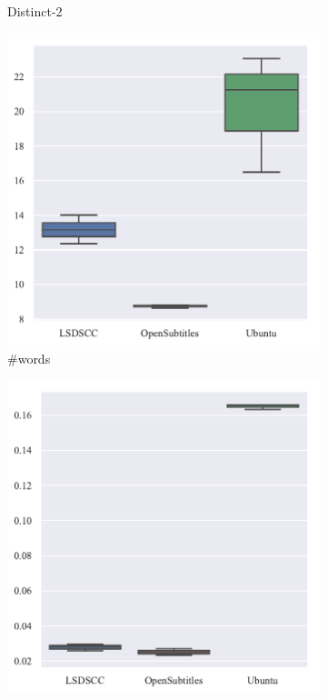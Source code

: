 \begin{figure}[H]
\begin{subfigure}{0.23\linewidth}
        \caption{Distinct-2}
    \end{subfigure}
    \begin{subfigure}{0.23\linewidth}
        \centering
        \includegraphics[width=\linewidth]{figure/boxplot/dataset/utterance_len/plot.pdf}
        \caption{\#words}
    \end{subfigure}%
    \begin{subfigure}{0.23\linewidth}
        \centering
        \includegraphics[width=\linewidth]{figure/boxplot/dataset/meteor/plot.pdf}

\end{subfigure}
\end{figure}
